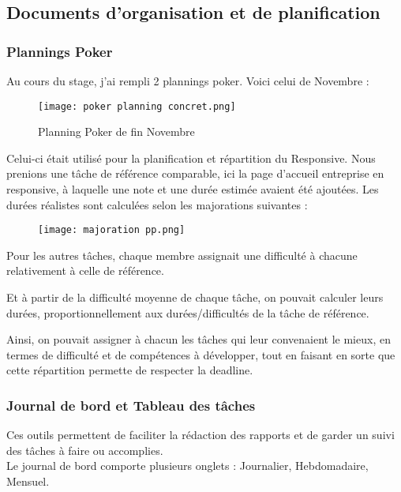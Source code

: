 \subsection{Documents d'organisation et de planification}

\subsubsection*{Plannings Poker}

Au cours du stage, j'ai rempli 2 plannings poker. Voici celui de Novembre :

\begin{figure}[H]
    \centering
    \texttt{[image: poker planning concret.png]}
    \caption{Planning Poker de fin Novembre}
\end{figure}

Celui-ci était utilisé pour la planification et répartition du Responsive. 
Nous prenions une tâche de référence comparable, ici la page d'accueil entreprise en responsive, à laquelle une note et une durée estimée avaient été ajoutées.
Les durées réalistes sont calculées selon les majorations suivantes :

\begin{figure}[H]
    \centering
    \texttt{[image: majoration pp.png]}
\end{figure}

Pour les autres tâches, chaque membre assignait une difficulté à chacune relativement à celle de référence.

Et à partir de la difficulté moyenne de chaque tâche, on pouvait calculer leurs durées, proportionnellement aux durées/difficultés de la tâche de référence.

Ainsi, on pouvait assigner à chacun les tâches qui leur convenaient le mieux, en termes de difficulté et de compétences à développer, tout en faisant en sorte que cette répartition permette de respecter la deadline.


\subsubsection*{Journal de bord et Tableau des tâches}

Ces outils permettent de faciliter la rédaction des rapports et de garder un suivi des tâches à faire ou accomplies.\\

Le journal de bord comporte plusieurs onglets : Journalier, Hebdomadaire, Mensuel. 

